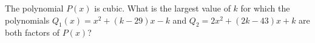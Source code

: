The polynomial $P(x)$ is cubic. What is the largest value of $k$ for which the polynomials $Q_{1}(x)=x^{2}+(k-29)x-k$ and $Q_{2}=2x^{2}+(2k-43)x+k$ are both factors of $P(x)$?